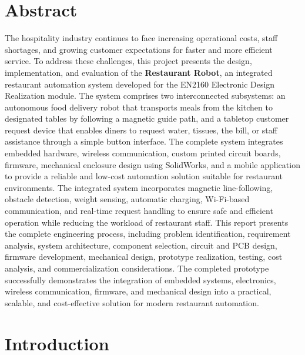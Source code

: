 \documentclass[12pt,a4paper]{article}
\begin{document}
\thispagestyle{empty}
\section*{Abstract}

The hospitality industry continues to face increasing operational costs, staff shortages, and growing customer expectations for faster and more efficient service. To address these challenges, this project presents the design, implementation, and evaluation of the \textbf{Restaurant Robot}, an integrated restaurant automation system developed for the EN2160 Electronic Design Realization module. The system comprises two interconnected subsystems: an autonomous food delivery robot that transports meals from the kitchen to designated tables by following a magnetic guide path, and a tabletop customer request device that enables diners to request water, tissues, the bill, or staff assistance through a simple button interface. The complete system integrates embedded hardware, wireless communication, custom printed circuit boards, firmware, mechanical enclosure design using SolidWorks, and a mobile application to provide a reliable and low-cost automation solution suitable for restaurant environments. The integrated system incorporates magnetic line-following, obstacle detection, weight sensing, automatic charging, Wi-Fi-based communication, and real-time request handling to ensure safe and efficient operation while reducing the workload of restaurant staff. This report presents the complete engineering process, including problem identification, requirement analysis, system architecture, component selection, circuit and PCB design, firmware development, mechanical design, prototype realization, testing, cost analysis, and commercialization considerations. The completed prototype successfully demonstrates the integration of embedded systems, electronics, wireless communication, firmware, and mechanical design into a practical, scalable, and cost-effective solution for modern restaurant automation.

\newpage

\tableofcontents
\newpage
\section{Introduction}
\end{document}
